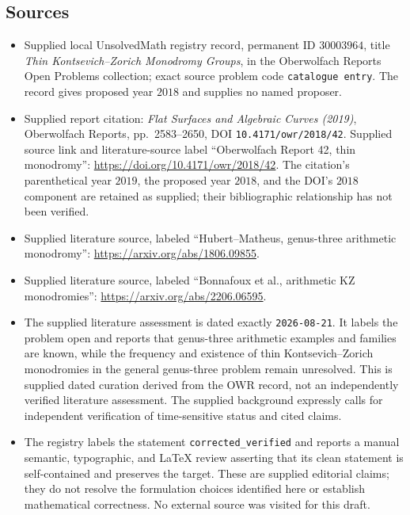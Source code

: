\documentclass[11pt]{article}
\begin{document}
\subsection{Sources}
\begin{itemize}
\item Supplied local UnsolvedMath registry record, permanent ID \(30003964\), title \emph{Thin Kontsevich--Zorich Monodromy Groups}, in the Oberwolfach Reports Open Problems collection; exact source problem code \texttt{catalogue entry}. The record gives proposed year \(2018\) and supplies no named proposer.
\item Supplied report citation: \emph{Flat Surfaces and Algebraic Curves (2019)}, Oberwolfach Reports, pp.\ 2583--2650, DOI \texttt{10.4171/owr/2018/42}. Supplied source link and literature-source label ``Oberwolfach Report 42, thin monodromy'': \url{https://doi.org/10.4171/owr/2018/42}. The citation's parenthetical year \(2019\), the proposed year \(2018\), and the DOI's \(2018\) component are retained as supplied; their bibliographic relationship has not been verified.
\item Supplied literature source, labeled ``Hubert--Matheus, genus-three arithmetic monodromy'': \url{https://arxiv.org/abs/1806.09855}.
\item Supplied literature source, labeled ``Bonnafoux et al., arithmetic KZ monodromies'': \url{https://arxiv.org/abs/2206.06595}.
\item The supplied literature assessment is dated exactly \texttt{2026-08-21}. It labels the problem open and reports that genus-three arithmetic examples and families are known, while the frequency and existence of thin Kontsevich--Zorich monodromies in the general genus-three problem remain unresolved. This is supplied dated curation derived from the OWR record, not an independently verified literature assessment. The supplied background expressly calls for independent verification of time-sensitive status and cited claims.
\item The registry labels the statement \texttt{corrected\_verified} and reports a manual semantic, typographic, and LaTeX review asserting that its clean statement is self-contained and preserves the target. These are supplied editorial claims; they do not resolve the formulation choices identified here or establish mathematical correctness. No external source was visited for this draft.
\end{itemize}
\end{document}
